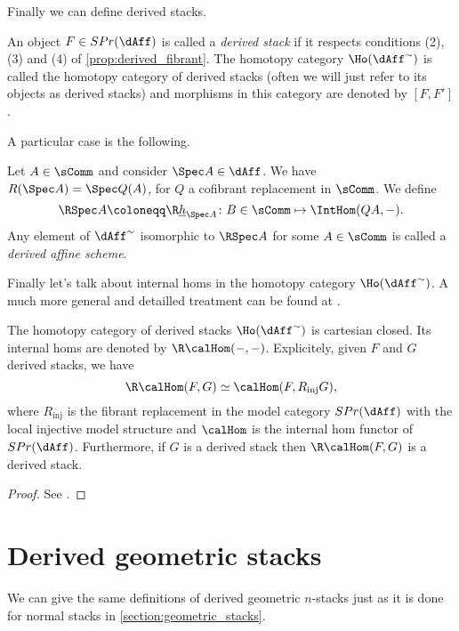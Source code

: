         Finally we can define derived stacks.
        \begin{defn}
            \label{defn:derived_stacks}
            An object $F \in SPr(\dAff)$ is called a \emph{derived stack} if it respects conditions (2), (3) and (4) of \cref{prop:derived_fibrant}.
            The homotopy category $\Ho(\dAff^{\sim})$ is called the homotopy category of derived stacks (often we will just refer to its objects as derived stacks) and morphisms in this category are denoted by $[F, F']$.
        \end{defn}
        A particular case is the following.
        \begin{defn}
            \label{defn:derived_affine_scheme}
            Let $A \in \sComm$ and consider $\Spec A \in \dAff$. We have $R(\Spec A) = \Spec Q(A)$, for $Q$ a cofibrant replacement in $\sComm$. We define \[\RSpec A \coloneqq \R\underline{h}_{\Spec A} \colon B \in \sComm \mapsto \IntHom(QA,-). \] Any element of $\dAff^{\sim}$ isomorphic to $\RSpec A$ for some $A \in \sComm$ is called a \emph{derived affine scheme}.
        \end{defn}
        Finally let's talk about internal homs in the homotopy category $\Ho(\dAff^{\sim})$. A much more general and detailled treatment can be found at \cite[3.6]{ToVe:hag1}.
        \begin{prop}
            \label{prop:derived_stacks_internal_hom}
            The homotopy category of derived stacks $\Ho(\dAff^{\sim})$ is cartesian closed. Its internal homs are denoted by $\R\calHom(-, -)$. Explicitely, given $F$ and $G$ derived stacks, we have \[\R\calHom(F, G) \simeq \calHom(F, R_{\mathrm{inj}}G), \] where $R_{\mathrm{inj}}$ is the fibrant replacement in the model category $SPr(\dAff)$ with the local injective model structure and $\calHom$ is the internal hom functor of $SPr(\dAff)$. Furthermore, if $G$ is a derived stack then $\R\calHom(F, G)$ is a derived stack.
        \end{prop}
        \begin{proof}
            See \cite[Proposition~3.6.1, Corollary~3.6.2, Definition~3.6.3]{ToVe:hag1}.
        \end{proof}
    \section{Derived geometric stacks}
        We can give the same definitions of derived geometric $n$-stacks just as it is done for normal stacks in \cref{section:geometric_stacks}.

